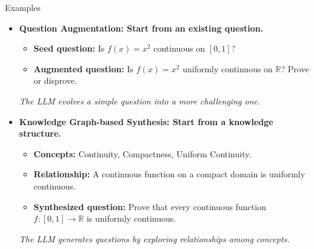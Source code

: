 \documentclass[aspectratio=169]{beamer}
\begin{document}
\begin{frame}{Examples}

\begin{itemize}
    \item \textbf{Question Augmentation: Start from an existing question.}

    \begin{itemize}
        \item \textbf{Seed question:}
        Is $f(x)=x^2$ continuous on $[0,1]$?

        \item \textbf{Augmented question:}
        Is $f(x)=x^2$ uniformly continuous on $\mathbb{R}$? Prove or disprove.
    \end{itemize}

    \textit{The LLM evolves a simple question into a more challenging one.}

    \vspace{0.5cm}

    \item \textbf{Knowledge Graph-based Synthesis: Start from a knowledge structure.}

    \begin{itemize}
        \item \textbf{Concepts:}
        Continuity, Compactness, Uniform Continuity.

        \item \textbf{Relationship:}
        A continuous function on a compact domain is uniformly continuous.

        \item \textbf{Synthesized question:}
        Prove that every continuous function
        $f:[0,1]\to\mathbb{R}$ is uniformly continuous.
    \end{itemize}

    \textit{The LLM generates questions by exploring relationships among concepts.}

\end{itemize}

\end{frame}
\end{document}
